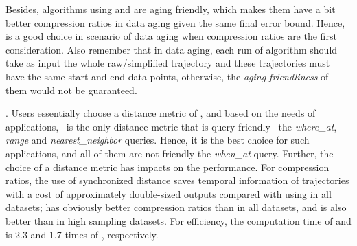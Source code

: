 {Besides, algorithms \dpa using \ped and \sed are aging friendly, which makes them have a bit better compression ratios in data aging given the same final error bound. Hence, \dpa is a good choice in scenario of data aging when compression ratios are the first consideration. Also remember that in data aging, each run of algorithm \dpa should take as input the whole raw/simplified trajectory and these trajectories must have the same start and end data points, otherwise, the \emph{aging friendliness} of them would not be guaranteed.}

. Users essentially choose a distance metric of \ped, \sed and \dad based on the needs of applications, \eg~\sed is the only distance metric that is query friendly {\wrt~the \emph{where\_at}, \emph{range} and \emph{nearest\_neighbor} queries. Hence, it is the best choice for such applications, and all of them are not friendly \wrt the \emph{when\_at} query.}
%
Further, the choice of a distance metric has impacts on the performance.
For compression ratios, the use of synchronized distance \sed saves temporal information of trajectories with a cost of approximately double-sized outputs compared with using \ped in all datasets; \ped has obviously better compression ratios than \dad in all datasets, and \sed is also better than \dad in high sampling datasets.
For efficiency, the computation time of \ped and \sed is 2.3 and 1.7 times of \dad, respectively.



%
%
